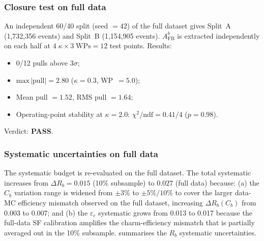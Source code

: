 \documentclass[11pt,a4paper]{article}
\begin{document}
\subsubsection{Closure test on full data}

An independent 60/40 split (seed $= 42$) of the full dataset gives
Split~A (1,732,356 events) and Split~B (1,154,905 events).
$A_\text{FB}^b$ is extracted independently on each half at
$4\;\kappa \times 3\;\text{WPs} = 12$ test points.
Results:
\begin{itemize}
\item 0/12 pulls above $3\sigma$;
\item $\text{max}\,|\text{pull}| = 2.80$ ($\kappa = 0.3$, WP~$= 5.0$);
\item Mean pull $= 1.52$, RMS pull $= 1.64$;
\item Operating-point stability at $\kappa = 2.0$:
  $\chi^2/\text{ndf} = 0.41/4$ ($p = 0.98$).
\end{itemize}
Verdict: \textbf{PASS}.

\subsubsection{Systematic uncertainties on full data}

The systematic budget is re-evaluated on the full dataset.
The total systematic increases from $\Delta R_b = 0.015$ (10\% subsample)
to $0.027$ (full data) because:
(a) the $C_b$ variation range is widened from $\pm 3\%$ to $\pm 5\%/10\%$
to cover the larger data-MC efficiency mismatch observed on the full
dataset, increasing $\Delta R_b(C_b)$ from 0.003 to 0.007; and
(b) the $\varepsilon_c$ systematic grows from 0.013 to 0.017 because
the full-data SF calibration amplifies the charm-efficiency mismatch
that is partially averaged out in the 10\% subsample.
 summarises the $R_b$ systematic
uncertainties.
\end{document}
